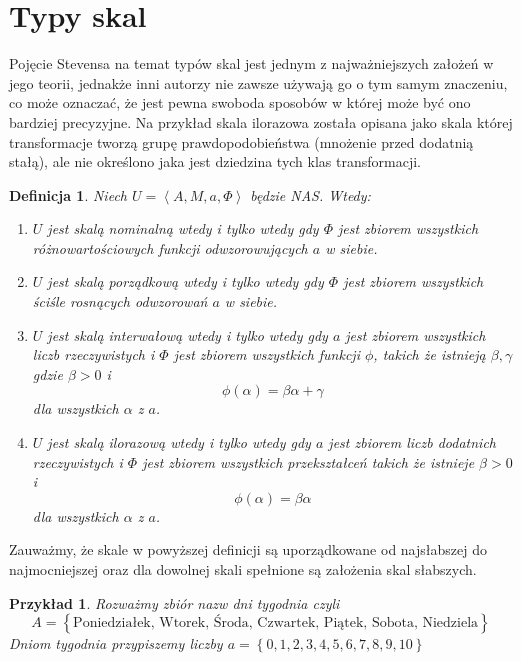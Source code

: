 \documentclass[12pt,a4paper]{report}
\newtheorem{definition}{Definicja}[chapter]
\newtheorem{przyklad}{Przykład}
\newcommand{\zbior}[1]{\left\lbrace {#1} \right\rbrace }
\newcommand{\tuple}[1]{\left\langle {#1} \right\rangle}
\begin{document}
\section{Typy skal}
Pojęcie Stevensa na temat typów skal jest jednym z najważniejszych założeń w jego teorii, jednakże inni autorzy nie zawsze używają go o tym samym znaczeniu, co może oznaczać, że jest pewna swoboda sposobów w której może być ono bardziej precyzyjne. Na przykład skala ilorazowa została opisana jako skala której transformacje tworzą grupę prawdopodobieństwa (mnożenie przed dodatnią stałą), ale nie określono jaka jest dziedzina tych klas transformacji.  
\begin{definition}
Niech $U=\tuple{A, M, a, \Phi}$ będzie NAS. Wtedy:
\begin{enumerate}
\item
$U$ jest skalą nominalną wtedy i tylko wtedy gdy $\Phi$ jest zbiorem wszystkich różnowartościowych funkcji odwzorowujących $a$ w siebie.
\item
$U$ jest skalą porządkową wtedy i tylko wtedy gdy $\Phi$ jest zbiorem wszystkich ściśle rosnących odwzorowań $a$ w siebie.
\item
$U$ jest skalą interwałową wtedy i tylko wtedy gdy $a$ jest zbiorem wszystkich liczb rzeczywistych i $\Phi$ jest zbiorem wszystkich funkcji $\phi$, takich że istnieją $\beta,\gamma$ gdzie $\beta>0$ i
\begin{equation*}
\phi(\alpha)=\beta\alpha+\gamma
\end{equation*}
dla wszystkich $\alpha$ z $a$.
\item
$U$ jest skalą ilorazową wtedy i tylko wtedy gdy $a$ jest zbiorem liczb dodatnich rzeczywistych i $\Phi$ jest zbiorem wszystkich przekształceń takich że istnieje $\beta>0$ i
\begin{equation*}
\phi(\alpha)=\beta\alpha
\end{equation*}
dla wszystkich $\alpha$ z $a$.
\end{enumerate}
\end{definition}

Zauważmy, że skale w powyższej definicji są uporządkowane od najsłabszej do najmocniejszej oraz dla dowolnej skali spełnione są założenia skal słabszych.

\begin{przyklad}
Rozważmy zbiór nazw dni tygodnia czyli
  $$
A=\zbior{\textrm{Poniedziałek, Wtorek, Środa, Czwartek, Piątek, Sobota, Niedziela}}
$$
Dniom tygodnia przypiszemy liczby $a=\zbior{0,1,2,3,4,5,6,7,8,9,10}$
\end{przyklad}
\end{document}
